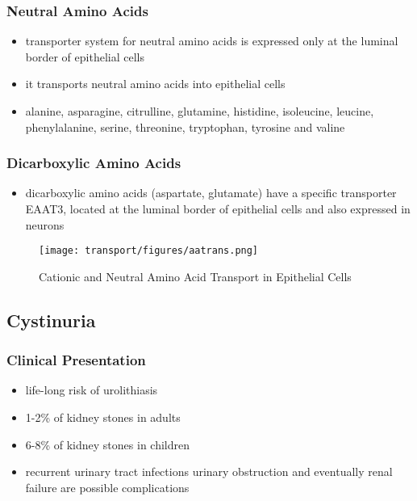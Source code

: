 \documentclass[12pt]{scrartcl}
\begin{document}
\begin{center}
\begin{center}
\subsubsection{Neutral  Amino Acids}
\label{sec:orgd0fd264}
\begin{itemize}
\item transporter system for neutral amino acids is expressed only at the
luminal border of epithelial cells
\item it transports neutral amino acids into epithelial cells
\item alanine, asparagine, citrulline, glutamine, histidine, isoleucine,
leucine, phenylalanine, serine, threonine, tryptophan, tyrosine
and valine
\end{itemize}
\subsubsection{Dicarboxylic Amino Acids}
\label{sec:org62c8ed5}
\begin{itemize}
\item dicarboxylic amino acids (aspartate, glutamate) have a specific
transporter EAAT3, located at the luminal border
of epithelial cells and also expressed in neurons
\end{itemize}

\begin{figure}[htbp]
\centering
\texttt{[image: transport/figures/aatrans.png]}
\caption{\label{fig:orgc9a37c6}Cationic and Neutral Amino Acid Transport in Epithelial Cells}
\end{figure}

\subsection{Cystinuria}
\label{sec:org5a8fcbf}
\subsubsection{Clinical Presentation}
\label{sec:org804423f}
\begin{itemize}
\item life-long risk of urolithiasis
\item 1-2\% of kidney stones in adults
\item 6-8\% of kidney stones in children
\item recurrent urinary tract infections urinary obstruction and
eventually renal failure are possible complications
\end{itemize}


\end{center}
\end{center}
\end{document}
